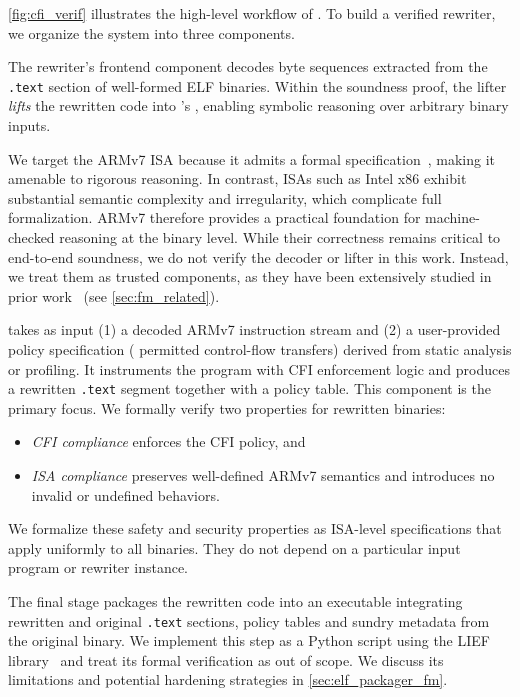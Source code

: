 \autoref{fig:cfi_verif} illustrates the high-level workflow of \pname. To build a verified rewriter, we organize the system into three components.

 The rewriter's frontend component decodes byte sequences extracted from the \texttt{.text} section of well-formed ELF binaries. Within the soundness proof, the lifter \emph{lifts} the rewritten code into \Picinae's \IL, enabling symbolic reasoning over arbitrary binary inputs.

We target the ARMv7 ISA because it admits a formal specification~\cite{armv7formalization}, making it amenable to rigorous reasoning.
{%
    In contrast, ISAs such as Intel x86 exhibit substantial semantic complexity and irregularity, which complicate full formalization.
}
ARMv7 therefore provides a practical foundation for machine-checked reasoning at the binary level.
%
While their correctness remains critical to end-to-end soundness, we do not verify the decoder or lifter in this work. Instead, we treat them as trusted components, as they have been extensively studied in prior work~\cite{bap, liblisa, armv8semantics1, armv8semantics2, armv8semantics3, armv8semantics4} (see \autoref{sec:fm_related}).


 \pname{} takes as input (1) a decoded ARMv7 instruction stream and (2) a user-provided policy specification (\eg{} permitted control-flow transfers) derived from static analysis or profiling. It instruments the program with CFI enforcement logic and produces a rewritten \texttt{.text} segment together with a policy table.
%
This component is the primary focus. We formally verify two properties for rewritten binaries:
%
\begin{itemize}[topsep=1ex,itemsep=-1ex,partopsep=1ex,parsep=1ex, leftmargin=2em]
  \item \emph{CFI compliance} enforces the CFI policy, and
  \item \emph{ISA compliance} preserves well-defined ARMv7 semantics and introduces no invalid or undefined behaviors.
\end{itemize}

We formalize these safety and security properties as ISA-level specifications that apply uniformly to all binaries. They do not depend on a particular input program or rewriter instance.

 The final stage packages the rewritten code into an executable integrating rewritten and original \texttt{.text} sections, policy tables and sundry metadata from the original binary.  We implement this step as a Python script using the LIEF library~\cite{lief} and treat its formal verification as out of scope. We discuss its limitations and potential hardening strategies in \autoref{sec:elf_packager_fm}.

